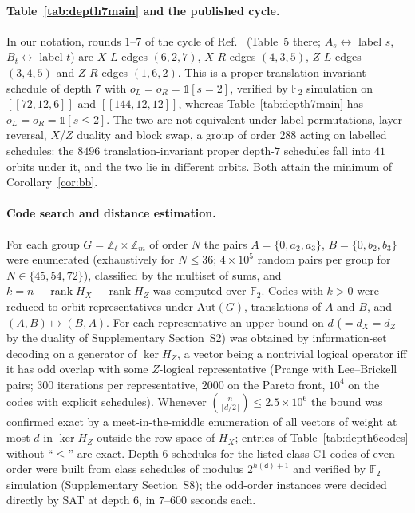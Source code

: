 \documentclass[reprint,twocolumn,superscriptaddress,nofootinbib]{revtex4-2}
\theoremstyle{plain}
\newcommand{\F}{\mathbb{F}_2}
\newcommand{\col}{\mathsf{d}}          %
\begin{document}
\paragraph*{Table~\ref{tab:depth7main} and the published cycle.}
In our notation, rounds $1$--$7$ of the cycle of Ref.~\cite{Bravyi2024}
(Table~5 there; $A_s\leftrightarrow$ label $s$, $B_t\leftrightarrow$ label
$t$) are $X$ $L$-edges $(6,2,7)$, $X$ $R$-edges $(4,3,5)$, $Z$ $L$-edges
$(3,4,5)$ and $Z$ $R$-edges $(1,6,2)$. This is a proper
translation-invariant schedule of depth $7$ with
$o_L=o_R=\mathbb{1}[s=2]$, verified by $\F$ simulation on $[[72,12,6]]$ and
$[[144,12,12]]$, whereas Table~\ref{tab:depth7main} has
$o_L=o_R=\mathbb{1}[s\le2]$. The two are not equivalent under label
permutations, layer reversal, $X$/$Z$ duality and block swap, a group of
order $288$ acting on labelled schedules: the $8496$ translation-invariant
proper depth-$7$ schedules fall into $41$ orbits under it, and the two lie
in different orbits. Both attain the minimum of Corollary~\ref{cor:bb}.

\paragraph*{Code search and distance estimation.}
For each group $G=\mathbb{Z}_\ell\times\mathbb{Z}_m$ of order $N$ the pairs
$A=\{0,a_2,a_3\}$, $B=\{0,b_2,b_3\}$ were enumerated (exhaustively for
$N\le36$; $4\times10^5$ random pairs per group for $N\in\{45,54,72\}$),
classified by the multiset of sums, and $k=n-\operatorname{rank}H_X-
\operatorname{rank}H_Z$ was computed over $\F$. Codes with $k>0$ were
reduced to orbit representatives under $\mathrm{Aut}(G)$, translations of
$A$ and $B$, and $(A,B)\mapsto(B,A)$. For each representative an upper
bound on $d$ ($=d_X=d_Z$ by the duality of Supplementary Section~S2) was
obtained by information-set decoding on a generator of $\ker H_Z$, a
vector being a nontrivial logical operator iff it has odd overlap with
some $Z$-logical representative (Prange with Lee--Brickell pairs; $300$
iterations per representative, $2000$ on the Pareto front, $10^4$ on the
codes with explicit schedules). Whenever
$\binom{n}{\lceil d/2\rceil}\le2.5\times10^6$ the bound was confirmed exact
by a meet-in-the-middle enumeration of all vectors of weight at most $d$
in $\ker H_Z$ outside the row space of $H_X$; entries of
Table~\ref{tab:depth6codes} without ``$\le$'' are exact. Depth-$6$
schedules for the listed class-C1 codes of even order were built from class
schedules of modulus $2^{h(\col)+1}$ and verified by $\F$ simulation
(Supplementary Section~S8); the odd-order instances were decided directly
by SAT at depth $6$, in $7$--$600$ seconds each.
\end{document}
